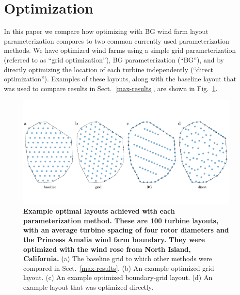 \documentclass[wes, manuscript]{copernicus}
\begin{document}
\section{Optimization}

In this paper we compare how optimizing with BG wind farm layout parameterization compares to two common currently used parameterization methods. We have optimized wind farms using a simple grid parameterization (referred to as ``grid optimization''), BG parameterization (``BG''),  and by directly optimizing the location of each turbine independently (``direct optimization''). Examples of these layouts, along with the baseline layout that was used to compare results in Sect.~\ref{max-results}, are shown in Fig.~\ref{opt-cases}.
%
\begin{figure}
\centering
\includegraphics{paper-figures/opt-cases}
\caption{\textbf{Example optimal layouts achieved with each parameterization method. These are 100 turbine layouts, with an average turbine spacing of four rotor diameters and the Princess Amalia wind farm boundary. They were optimized with the wind rose from North Island, California.} (a) The baseline grid to which other methods were compared in Sect.~\ref{max-results}. (b) An example optimized grid layout. (c) An example optimized boundary-grid layout. (d) An example layout that was optimized directly.}
\label{opt-cases}
\end{figure}
\end{document}
